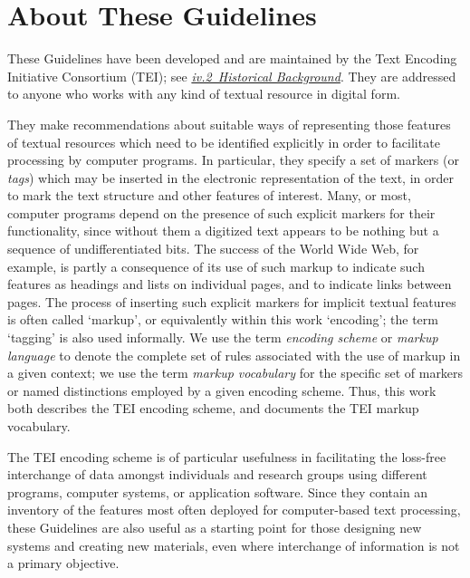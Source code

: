 
\section[{About These Guidelines}]{About These Guidelines}\label{AB}\par
These Guidelines have been developed and are maintained by the Text Encoding Initiative Consortium (TEI); see \textit{\hyperref[ABTEI]{iv.2\ Historical Background}}. They are addressed to anyone who works with any kind of textual resource in digital form.\par
They make recommendations about suitable ways of representing those features of textual resources which need to be identified explicitly in order to facilitate processing by computer programs. In particular, they specify a set of markers (or \textit{tags}) which may be inserted in the electronic representation of the text, in order to mark the text structure and other features of interest. Many, or most, computer programs depend on the presence of such explicit markers for their functionality, since without them a digitized text appears to be nothing but a sequence of undifferentiated bits. The success of the World Wide Web, for example, is partly a consequence of its use of such markup to indicate such features as headings and lists on individual pages, and to indicate links between pages. The process of inserting such explicit markers for implicit textual features is often called ‘markup’, or equivalently within this work ‘encoding’; the term ‘tagging’ is also used informally. We use the term \textit{encoding scheme} or \textit{markup language} to denote the complete set of rules associated with the use of markup in a given context; we use the term \textit{markup vocabulary} for the specific set of markers or named distinctions employed by a given encoding scheme. Thus, this work both describes the TEI encoding scheme, and documents the TEI markup vocabulary.\par
The TEI encoding scheme is of particular usefulness in facilitating the loss-free interchange of data amongst individuals and research groups using different programs, computer systems, or application software. Since they contain an inventory of the features most often deployed for computer-based text processing, these Guidelines are also useful as a starting point for those designing new systems and creating new materials, even where interchange of information is not a primary objective. \par

